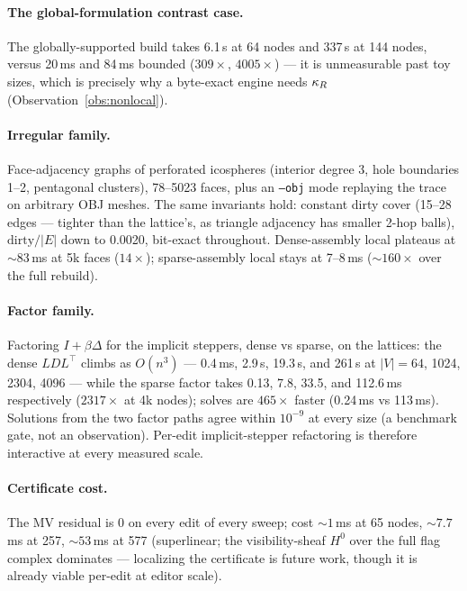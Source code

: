 \paragraph*{The global-formulation contrast case.}
The globally-supported build takes 6.1\,s at 64 nodes and 337\,s at 144
nodes, versus 20\,ms and 84\,ms bounded ($309\times$, $4005\times$) --- it
is unmeasurable past toy sizes, which is precisely why a byte-exact engine
needs $\kappa_R$ (Observation~\ref{obs:nonlocal}).

\paragraph*{Irregular family.}
Face-adjacency graphs of perforated icospheres (interior degree 3, hole
boundaries 1--2, pentagonal clusters), 78--5023 faces, plus an
\texttt{--obj} mode replaying the trace on arbitrary OBJ meshes. The same
invariants hold: constant dirty cover (15--28 edges --- tighter than the
lattice's, as triangle adjacency has smaller 2-hop balls),
$\mathrm{dirty}/|E|$ down to 0.0020, bit-exact throughout. Dense-assembly
local plateaus at ${\sim}83$\,ms at 5k faces ($14\times$); sparse-assembly
local stays at 7--8\,ms (${\sim}160\times$ over the full rebuild).

\paragraph*{Factor family.}
Factoring $I + \beta\Delta$ for the implicit steppers, dense vs sparse, on
the lattices: the dense $LDL^\top$ climbs as $O(n^3)$ --- 0.4\,ms, 2.9\,s,
19.3\,s, and 261\,s at $|V| = 64$, 1024, 2304, 4096 --- while the sparse
factor takes 0.13, 7.8, 33.5, and 112.6\,ms respectively ($2317\times$ at
4k nodes); solves are $465\times$ faster (0.24\,ms vs 113\,ms). Solutions
from the two factor paths agree within $10^{-9}$ at every size (a benchmark
gate, not an observation). Per-edit implicit-stepper refactoring is
therefore interactive at every measured scale.

\paragraph*{Certificate cost.}
The MV residual is 0 on every edit of every sweep; cost ${\sim}1$\,ms at 65
nodes, ${\sim}7.7$\,ms at 257, ${\sim}53$\,ms at 577 (superlinear; the
visibility-sheaf $H^0$ over the full flag complex dominates --- localizing
the certificate is future work, though it is already viable per-edit at
editor scale).

